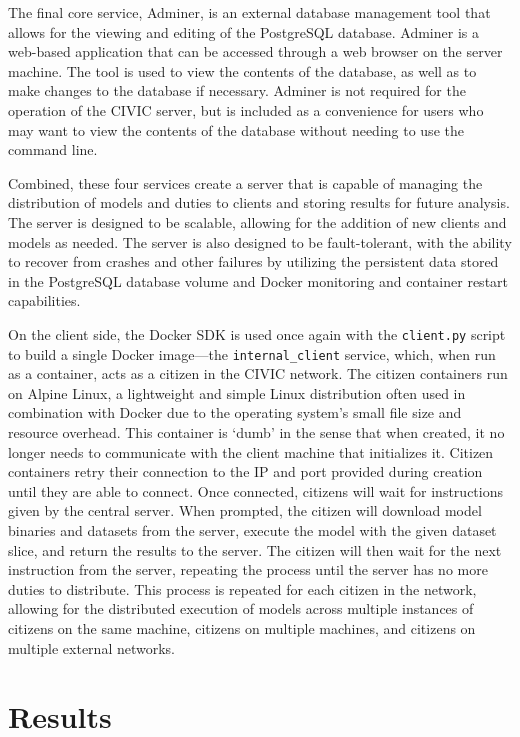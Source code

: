 \documentclass[11pt]{article}
\begin{document}
The final core service, Adminer, is an external database management tool that allows for the viewing and editing of the PostgreSQL database. Adminer is a web-based application that can be accessed through a web browser on the server machine. The tool is used to view the contents of the database, as well as to make changes to the database if necessary. Adminer is not required for the operation of the CIVIC server, but is included as a convenience for users who may want to view the contents of the database without needing to use the command line.

Combined, these four services create a server that is capable of managing the distribution of models and duties to clients and storing results for future analysis. The server is designed to be scalable, allowing for the addition of new clients and models as needed. The server is also designed to be fault-tolerant, with the ability to recover from crashes and other failures by utilizing the persistent data stored in the PostgreSQL database volume and Docker monitoring and container restart capabilities.

On the client side, the Docker SDK is used once again with the \verb|client.py| script to build a single Docker image---the \verb|internal_client| service, which, when run as a container, acts as a citizen in the CIVIC network. The citizen containers run on Alpine Linux, a lightweight and simple Linux distribution often used in combination with Docker due to the operating system's small file size and resource overhead. This container is `dumb' in the sense that when created, it no longer needs to communicate with the client machine that initializes it. Citizen containers retry their connection to the IP and port provided during creation until they are able to connect. Once connected, citizens will wait for instructions given by the central server. When prompted, the citizen will download model binaries and datasets from the server, execute the model with the given dataset slice, and return the results to the server. The citizen will then wait for the next instruction from the server, repeating the process until the server has no more duties to distribute. This process is repeated for each citizen in the network, allowing for the distributed execution of models across multiple instances of citizens on the same machine, citizens on multiple machines, and citizens on multiple external networks. 

\section{Results}
\end{document}
